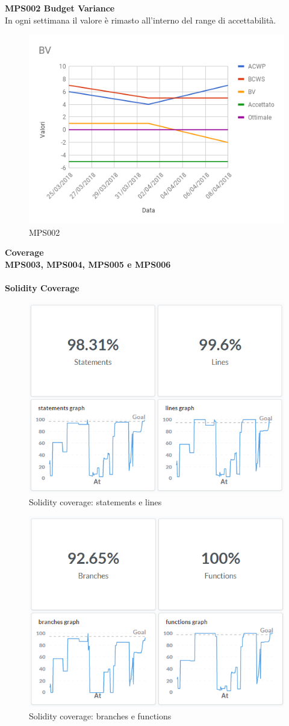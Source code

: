 \documentclass[PianoDiQualifica.tex]{subfiles}
\begin{document}
\textbf{MPS002 Budget Variance}\\
In ogni settimana il valore è rimasto all'interno del range di accettabilità.
\begin{figure}[H]
	\centering
	\includegraphics[width=0.8\linewidth]{RQ/BV}
	\caption{MPS002}
	\label{fig:processi}
\end{figure}
\newpage
\textbf{Coverage}
\\
\textbf{MPS003, MPS004, MPS005 e MPS006}
\\\\
\textbf{Solidity Coverage}
\begin{figure}[H]
	\centering
	\includegraphics[width=0.6\linewidth]{RQ/SolidityCoverage1}
	\caption{Solidity coverage: statements e lines}
	\label{fig:processi}
\end{figure}
\begin{figure}[H]
	\centering
	\includegraphics[width=0.6\linewidth]{RQ/SolidityCoverage2}
	\caption{Solidity coverage: branches e functions}
	\label{fig:processi}
\end{figure}
\newpage
\end{document}
